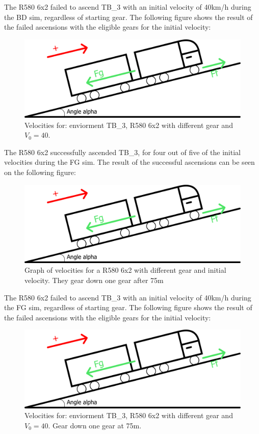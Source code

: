 \documentclass[noprint]{uit-thesis}
\begin{document}
The R580 6x2 failed to ascend TB\_3 with an initial velocity of 40km/h during the BD sim, regardless of starting gear. The following figure shows the result of the failed ascensions with the eligible gears for the initial velocity:
\begin{figure}[H]
\includegraphics[width=\textwidth, height=0.45\textheight]{photo/freeBodyDiagram.png}
\caption{Velocities for: enviorment TB\_3, R580 6x2 with different gear and $V_0 = 40$.}
\label{fig:TB3_6x2_40}
\end{figure}

The R580 6x2 successfully ascended TB\_3, for four out of five of the initial velocities during the FG sim. The result of the successful ascensions can be seen on the following figure:
\begin{figure}[H]
\includegraphics[width=\textwidth, height=0.37\textheight]{photo/freeBodyDiagram.png}
\caption{Graph of velocities for a R580 6x2 with different gear and initial velocity. They gear down one gear after 75m}
\label{fig:TB36x2GR}
\end{figure}

The R580 6x2 failed to ascend TB\_3 with an initial velocity of 40km/h during the FG sim, regardless of starting gear. The following figure shows the result of the failed ascensions with the eligible gears for the initial velocity:
\begin{figure}[H]
\includegraphics[width=\textwidth, height=0.37\textheight]{photo/freeBodyDiagram.png}
\caption{Velocities for: enviorment TB\_3, R580 6x2 with different gear and $V_0 = 40$. Gear down one gear at 75m.}
\label{fig:TB3_6x2_40}
\end{figure}
\end{document}
